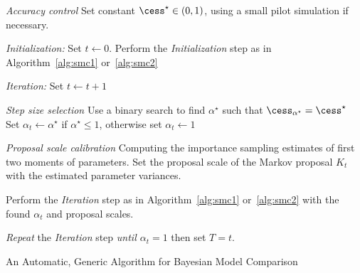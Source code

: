 \begin{algorithm}
\begin{algorithmic}
  \tophrule
  \STATE \emph{Accuracy control}
  \STATE\STATESKIP Set constant $\cess^\star\in(0,1)$, using a small pilot
  simulation if necessary.

  \STATE \emph{Initialization:} Set $t\leftarrow0$.
  \STATE\STATESKIP Perform the \emph{Initialization} step
    as in Algorithm~\ref{alg:smc1} or~\ref{alg:smc2}

  \STATE \emph{Iteration:} Set $t\leftarrow t + 1$

  \STATE\STATESKIP \emph{Step size selection}
  \STATE\STATESKIP\STATESKIP Use a binary search %
  to find $\alpha^\star$ such that $\cess_{\alpha^\star} = \cess^\star$
  \STATE\STATESKIP\STATESKIP Set $\alpha_t \leftarrow\alpha^\star$ if
    $\alpha^\star \le 1$, otherwise set $\alpha_t\leftarrow1$

  \STATE\STATESKIP \emph{Proposal scale calibration}
  \STATE\STATESKIP\STATESKIP
  Computing the importance sampling estimates of first two moments of
  parameters.
  \STATE\STATESKIP\STATESKIP
  Set the proposal scale of the Markov proposal $K_t$ with the estimated
  parameter variances.

  \STATE\STATESKIP Perform the \emph{Iteration} step as in
  Algorithm~\ref{alg:smc1} or~\ref{alg:smc2} with the found $\alpha_t$
  and proposal scales.

  \STATE \emph{Repeat} the \emph{Iteration} step %
    \emph{until $\alpha_t = 1$} then set $T=t$.
  \bottomhrule
\end{algorithmic}
\caption{An Automatic, Generic Algorithm for Bayesian Model Comparison}
\label{alg:adaptive}
\end{algorithm}
